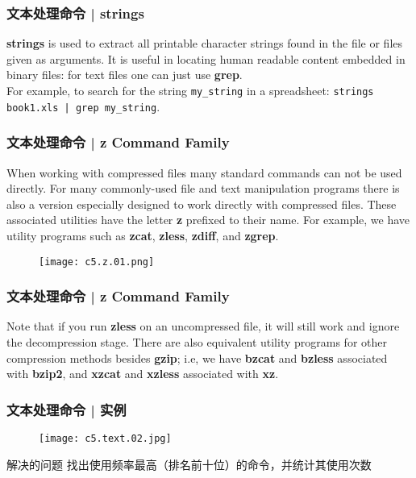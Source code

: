 \begin{frame}[fragile]
  \frametitle{文本处理命令 | strings}
  \textbf{strings} is used to extract all printable character strings found in
  the file or files given as arguments. It is useful in locating human
  readable content embedded in binary files: for text files one can just
  use \textbf{grep}.\\
  \vspace{0.3cm}
  For example, to search for the string \verb|my_string| in a spreadsheet: \verb=strings book1.xls | grep my_string=.
\end{frame}

\begin{frame}
  \frametitle{文本处理命令 | z Command Family}
  When working with compressed files many standard commands can not be used directly. For many commonly-used file and text manipulation programs there is also a version especially designed to work directly with compressed files. These associated utilities have the letter \textbf{z} prefixed to their name. For example, we have utility programs such as \textbf{zcat}, \textbf{zless}, \textbf{zdiff}, and \textbf{zgrep}.\\
  \begin{figure}
    \centering
    \texttt{[image: c5.z.01.png]}
  \end{figure}
\end{frame}

\begin{frame}
  \frametitle{文本处理命令 | z Command Family}
  Note that if you run \textbf{zless} on an uncompressed file, it will still work and ignore the decompression stage. There are also equivalent utility programs for other compression methods besides \textbf{gzip}; i.e, we have \textbf{bzcat} and \textbf{bzless} associated with \textbf{bzip2}, and \textbf{xzcat} and \textbf{xzless} associated with \textbf{xz}.
\end{frame}

\begin{frame}
  \frametitle{文本处理命令 | \alert{实例}}
  \begin{figure}
    \centering
    \texttt{[image: c5.text.02.jpg]}
  \end{figure}
  \pause
  \begin{block}{解决的问题}
    找出使用频率最高（排名前十位）的命令，并统计其使用次数
  \end{block}
\end{frame}

